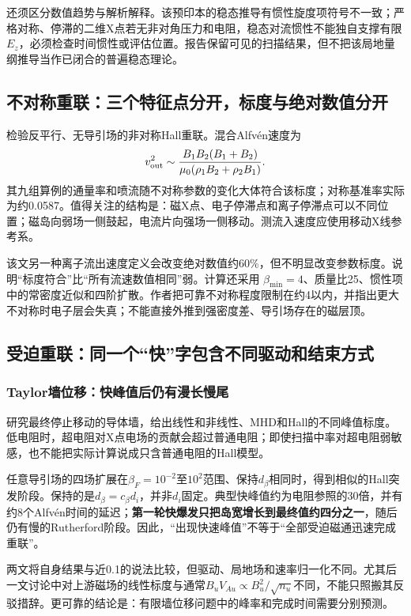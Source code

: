 \documentclass[UTF8,a4paper,11pt,openany,fontset=fandol]{ctexbook}
\begin{document}
还须区分数值趋势与解析解释。该预印本的稳态推导有惯性旋度项符号不一致；严格对称、停滞的二维X点若无非对角压力和电阻，稳态对流惯性不能独自支撑有限 $E_z$，必须检查时间惯性或评估位置。报告保留可见的扫描结果，但不把该局地量纲推导当作已闭合的普遍稳态理论。

\subsection{不对称重联：三个特征点分开，标度与绝对数值分开}
\citet{Cassak2008}检验反平行、无导引场的非对称Hall重联。混合Alfvén速度为
\begin{equation}
v_{\rm out}^2\sim\frac{B_1B_2(B_1+B_2)}{\mu_0(\rho_1B_2+\rho_2B_1)}.
\end{equation}
其九组算例的通量率和喷流随不对称参数的变化大体符合该标度；对称基准率实际为约0.0587。值得关注的结构是：磁X点、电子停滞点和离子停滞点可以不同位置；磁岛向弱场一侧鼓起，电流片向强场一侧移动。测流入速度应使用移动X线参考系。

该文另一种离子流出速度定义会改变绝对数值约60\%，但不明显改变参数标度。说明“标度符合”比“所有流速数值相同”弱。计算还采用 $\beta_{\min}=4$、质量比25、惯性项中的常密度近似和四阶扩散。作者把可靠不对称程度限制在约4以内，并指出更大不对称时电子层会失真；不能直接外推到强密度差、导引场存在的磁层顶。

\subsection{受迫重联：同一个“快”字包含不同驱动和结束方式}
\subsubsection{Taylor墙位移：快峰值后仍有漫长慢尾}
\citet{L057}研究最终停止移动的导体墙，给出线性和非线性、MHD和Hall的不同峰值标度。低电阻时，超电阻对X点电场的贡献会超过普通电阻；即使扫描中率对超电阻弱敏感，也不能把实际计算说成只含普通电阻的Hall模型。

任意导引场的四场扩展在$\beta_F=10^{-2}$至$10^2$范围、保持$d_\beta$相同时，得到相似的Hall突发阶段。保持的是$d_\beta=c_\beta d_i$，并非$d_i$固定。典型快峰值约为电阻参照的30倍，并有约8个Alfvén时间的延迟；\textbf{第一轮快爆发只把岛宽增长到最终值约四分之一}，随后仍有慢的Rutherford阶段。因此，“出现快速峰值”不等于“全部受迫磁通迅速完成重联”。\citep{L058}

两文将自身结果与近0.1的说法比较，但驱动、局地场和速率归一化不同。尤其后一文讨论中对上游磁场的线性标度与通常$B_uV_{Au}\propto B_u^2/\sqrt{n_u}$不同，不能只照搬其反驳措辞。更可靠的结论是：有限墙位移问题中的峰率和完成时间需要分别预测。
\end{document}
